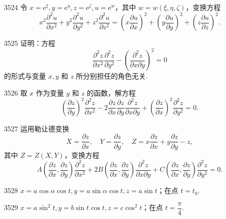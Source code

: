 \begin{prob}[M]{3524}
令 $x = \mathrm{e}^\xi, y = \mathrm{e}^\eta, z = \mathrm{e}^\zeta, u = \mathrm{e}^w$，其中 $w = w(\xi, \eta, \zeta)$，变换方程
\[
x^2\frac{\partial^2 u}{\partial x^2} + y^2\frac{\partial^2 u}{\partial y^2} + z^2\frac{\partial^2 u}{\partial z^2} = \left(x\frac{\partial u}{\partial x}\right)^2 + \left(y\frac{\partial u}{\partial y}\right)^2 + \left(z\frac{\partial u}{\partial z}\right)^2.
\]
\end{prob}

\begin{prob}[M]{3525}
证明：方程
\[
\frac{\partial^2 z}{\partial x^2}\frac{\partial^2 z}{\partial y^2} - \left(\frac{\partial^2 z}{\partial x\partial y}\right)^2 = 0
\]
的形式与变量 $x, y$ 和 $z$ 所分别担任的角色无关.
\end{prob}

\begin{prob}[M]{3526}
取 $x$ 作为变量 $y$ 和 $z$ 的函数，解方程
\[
\left(\frac{\partial z}{\partial y}\right)^2 \frac{\partial^2 z}{\partial x^2} - 2\frac{\partial z}{\partial x}\frac{\partial z}{\partial y}\frac{\partial^2 z}{\partial x\partial y} + \left(\frac{\partial z}{\partial x}\right)^2 \frac{\partial^2 z}{\partial y^2} = 0.
\]
\end{prob}

\begin{prob}[M]{3527}
运用勒让德变换
\[
X = \frac{\partial z}{\partial x}, \quad Y = \frac{\partial z}{\partial y}, \quad Z = x\frac{\partial z}{\partial x} + y\frac{\partial z}{\partial y} - z,
\]
其中 $Z = Z(X, Y)$，变换方程
\[
A\left(\frac{\partial z}{\partial x}, \frac{\partial z}{\partial y}\right)\frac{\partial^2 z}{\partial x^2} + 2B\left(\frac{\partial z}{\partial x}, \frac{\partial z}{\partial y}\right)\frac{\partial^2 z}{\partial x\partial y} + C\left(\frac{\partial z}{\partial x}, \frac{\partial z}{\partial y}\right)\frac{\partial^2 z}{\partial y^2} = 0.
\]
\end{prob}



\begin{prob}[S]{3528}
$x = a\cos\alpha\cos t, y = a\sin\alpha\cos t, z = a\sin t$；在点 $t = t_0$.
\end{prob}

\begin{prob}[S]{3529}
$x = a\sin^2 t, y = b\sin t\cos t, z = c\cos^2 t$；在点 $t = \dfrac{\pi}{4}$.
\end{prob}

